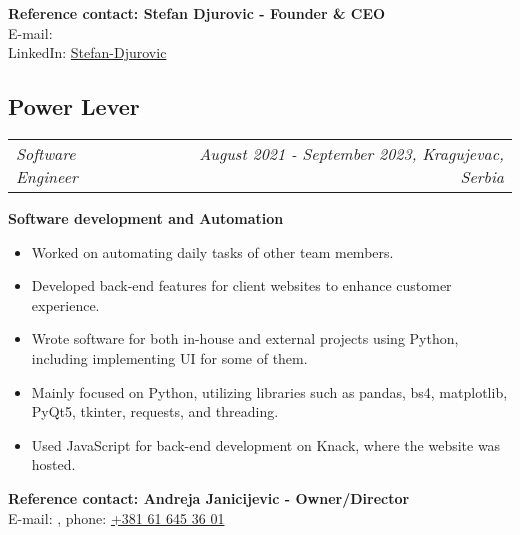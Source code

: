 \documentclass[11pt,a4paper]{moderncv}
\newcommand*{\experienceentry}[5][1.5mm]{
    \subsection{#2} \vspace{-1.5mm}
    \begin{tabularx}{\textwidth}{LR}
        {\itshape #3} & {\itshape #4, #5}
    \end{tabularx}
    \par\addvspace{#1}
}
\begin{document}
\begin{minipage}[t]{0.62\textwidth}
    \hspace{1.0mm}
    
    \textbf{Reference contact: Stefan Djurovic - Founder \& CEO} \\
    E-mail:        \\
    LinkedIn: \faLinkedin\href{https://www.linkedin.com/in/stefan-djurovic/}{Stefan-Djurovic}

    \vspace{1.0mm}
    
    \experienceentry{Power Lever}{Software Engineer}{August 2021 - September 2023}{Kragujevac, Serbia}

    \textbf{Software development and Automation}
    \begin{itemize}
        \item Worked on automating daily tasks of other team members.
        \item Developed back-end features for client websites to enhance customer experience.
        \item Wrote software for both in-house and external projects using Python, including implementing UI for some of them.
        \item Mainly focused on Python, utilizing libraries such as pandas, bs4, matplotlib, PyQt5, tkinter, requests, and threading.
        \item Used JavaScript for back-end development on Knack, where the website was hosted.
    \end{itemize}
    
    \hspace{1.0mm}

    \textbf{Reference contact: Andreja Janicijevic - Owner/Director}\\
    E-mail: , phone: \href{tel:+381616453601}{+381 61 645 36 01}

    \vspace{2.0mm}

\end{minipage}
\hfill
\end{document}
